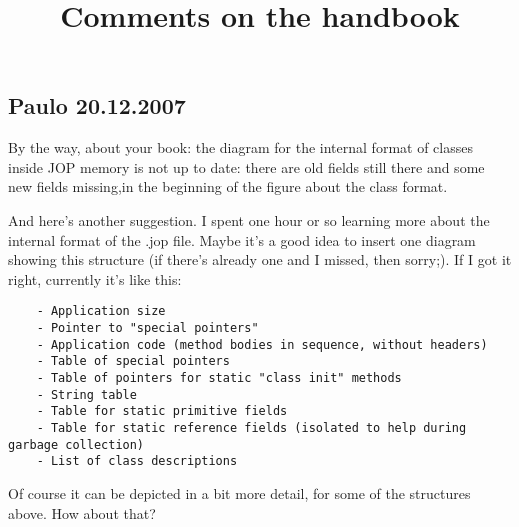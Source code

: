 \documentclass[a4paper,12pt,twocolumn]{scrartcl}
\begin{document}
\title{Comments on the handbook}
\maketitle \thispagestyle{empty}

\subsection*{Paulo 20.12.2007}



By the way, about your book: the diagram for the internal format of
classes inside JOP memory is not up to date: there are old fields
still there and some new fields missing,in the beginning of the
figure about the class format.

And here's another suggestion. I spent one hour or so learning more
about the internal format of the .jop file. Maybe it's a good idea to
insert one diagram showing this structure (if there's already one and
I missed, then sorry;). If I got it right, currently it's like this:
\begin{verbatim}
    - Application size
    - Pointer to "special pointers"
    - Application code (method bodies in sequence, without headers)
    - Table of special pointers
    - Table of pointers for static "class init" methods
    - String table
    - Table for static primitive fields
    - Table for static reference fields (isolated to help during garbage collection)
    - List of class descriptions
\end{verbatim}

Of course it can be depicted in a bit more detail, for some of the
structures above. How about that?
\end{document}
